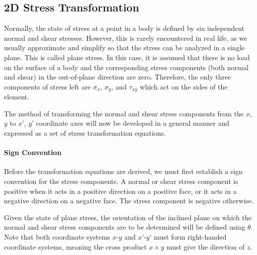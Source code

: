 \documentclass[
10pt,
a4paper,
openany,
svgnames,
]{book}
\begin{document}
\subsection{2D Stress Transformation}

Normally, the state of stress at a point in a body is defined by six independent normal and shear stresses. However, this is rarely encountered in real life, as we usually approximate and simplify so that the stress can be analyzed in a single plane. This is called plane stress. In this case, it is assumed that there is no load on the surface of a body and the corresponding stress components (both normal and shear) in the out-of-plane direction are zero. Therefore, the only three components of stress left are $\sigma_x$, $\sigma_y$, and $\tau_{xy}$ which act on the sides of the element.

The method of transforming the normal and shear stress components from the $x$, $y$ to $x’$, $y’$ coordinate axes will now be developed in a general manner and expressed as a set of stress transformation equations.

\paragraph{Sign Convention} Before the transformation equations are derived, we must first establish a sign convention for the stress components. A normal or shear stress component is positive when it acts in a positive direction on a positive face, or it acts in a negative direction on a negative face. The stress component is negative otherwise.

Given the state of plane stress, the orientation of the inclined plane on which the normal and shear stress components are to be determined will be defined using $\theta$. Note that both coordinate systems $x$-$y$ and $x’$-$y’$ must form right-handed coordinate systems, meaning the cross product $x \times y$ must give the direction of $z$.
\end{document}
